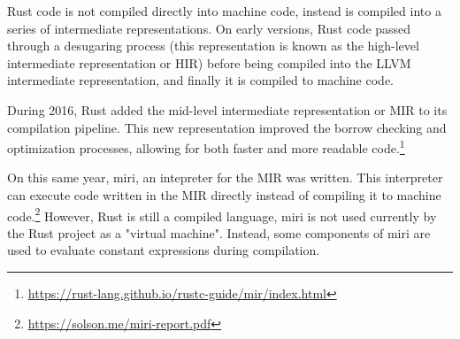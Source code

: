 Rust code is not compiled directly into machine code, instead is compiled into
a series of intermediate representations. On early versions, Rust code passed
through a desugaring process (this representation is known as the high-level
intermediate representation or HIR) before being compiled into the LLVM
intermediate representation, and finally it is compiled to machine
code.

During 2016, Rust added the mid-level intermediate representation or MIR to its
compilation pipeline. This new representation improved the borrow checking
and optimization processes, allowing for both faster and more readable
code.\footnote{\url{https://rust-lang.github.io/rustc-guide/mir/index.html}}

On this same year, miri, an intepreter for the MIR was written. This interpreter
can execute code written in the MIR directly instead of compiling it to machine
code.\footnote{\url{https://solson.me/miri-report.pdf}} However, Rust is still
a compiled language, miri is not used currently by the Rust project as a
"virtual machine". Instead, some components of miri are used to evaluate
constant expressions during compilation.
